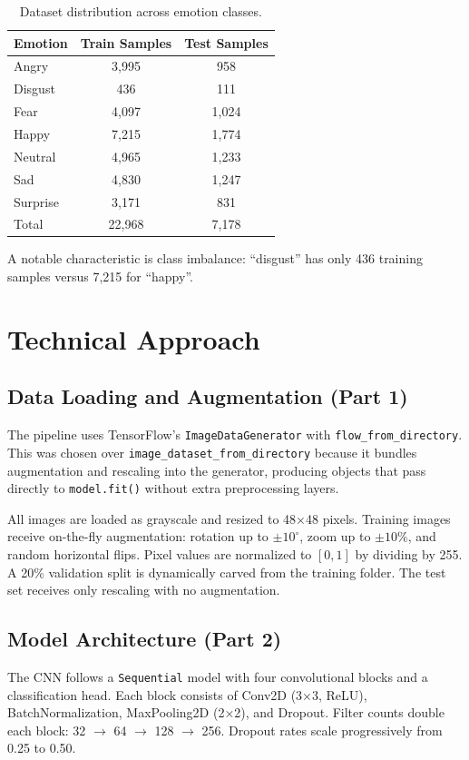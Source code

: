 \documentclass[12pt,a4paper]{article}
\begin{document}
\begin{table}[H]
    \centering
    \caption{Dataset distribution across emotion classes.}
    \label{tab:dataset}
    \begin{tabular}{lcc}
        \toprule
        Emotion & Train Samples & Test Samples \\
        \midrule
        Angry    & 3,995 & 958 \\
        Disgust  & 436   & 111 \\
        Fear     & 4,097 & 1,024 \\
        Happy    & 7,215 & 1,774 \\
        Neutral  & 4,965 & 1,233 \\
        Sad      & 4,830 & 1,247 \\
        Surprise & 3,171 & 831 \\
        \midrule
        Total    & 22,968 & 7,178 \\
        \bottomrule
    \end{tabular}
\end{table}

A notable characteristic is class imbalance: ``disgust'' has only 436 training samples versus 7,215 for ``happy''.

\section{Technical Approach}

\subsection{Data Loading and Augmentation (Part 1)}
The pipeline uses TensorFlow's \texttt{ImageDataGenerator} with \texttt{flow\_from\_directory}. This was chosen over \texttt{image\_dataset\_from\_directory} because it bundles augmentation and rescaling into the generator, producing objects that pass directly to \texttt{model.fit()} without extra preprocessing layers.

All images are loaded as grayscale and resized to 48×48 pixels. Training images receive on-the-fly augmentation: rotation up to $\pm 10^\circ$, zoom up to $\pm 10\%$, and random horizontal flips. Pixel values are normalized to $[0,1]$ by dividing by 255. A 20\% validation split is dynamically carved from the training folder. The test set receives only rescaling with no augmentation.

\subsection{Model Architecture (Part 2)}
The CNN follows a \texttt{Sequential} model with four convolutional blocks and a classification head. Each block consists of Conv2D (3×3, ReLU), BatchNormalization, MaxPooling2D (2×2), and Dropout. Filter counts double each block: 32 $\rightarrow$ 64 $\rightarrow$ 128 $\rightarrow$ 256. Dropout rates scale progressively from 0.25 to 0.50.
\end{document}
